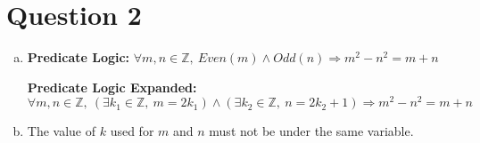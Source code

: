 \documentclass[12pt]{article}
\begin{document}
\begin{itemize}









\end{itemize}

\section*{Question 2}
\begin{enumerate}[a.]
    \item

    \textbf{Predicate Logic:} $\forall m,n \in \mathbb{Z},\:Even(m) \land Odd(n) \Rightarrow m^2 - n^2 = m + n$

    \bigskip

    \textbf{Predicate Logic Expanded:} $\forall m,n \in \mathbb{Z},\:(\exists k_1
    \in \mathbb{Z},\:m = 2k_1) \land (\exists k_2 \in \mathbb{Z},\: n = 2k_2 + 1)
    \Rightarrow m^2 - n^2 = m + n$

    \item The value of $k$ used for $m$ and $n$ must not be under the same variable.

\end{enumerate}
\end{document}
